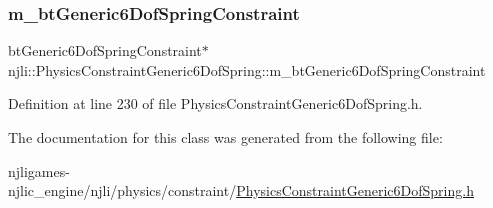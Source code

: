 \subsubsection{\texorpdfstring{m\+\_\+bt\+Generic6\+Dof\+Spring\+Constraint}{m\_btGeneric6DofSpringConstraint}}
{\footnotesize\ttfamily bt\+Generic6\+Dof\+Spring\+Constraint$\ast$ njli\+::\+Physics\+Constraint\+Generic6\+Dof\+Spring\+::m\+\_\+bt\+Generic6\+Dof\+Spring\+Constraint\hspace{0.3cm}{\ttfamily [private]}}



Definition at line 230 of file Physics\+Constraint\+Generic6\+Dof\+Spring.\+h.



The documentation for this class was generated from the following file\+:\begin{DoxyCompactItemize}
\item 
njligames-\/njlic\+\_\+engine/njli/physics/constraint/\mbox{\hyperlink{_physics_constraint_generic6_dof_spring_8h}{Physics\+Constraint\+Generic6\+Dof\+Spring.\+h}}\end{DoxyCompactItemize}
